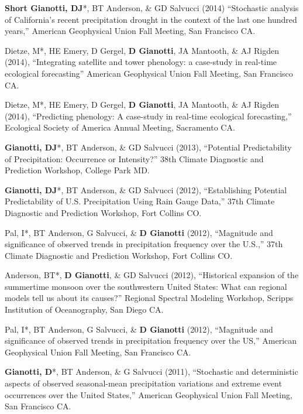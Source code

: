 \documentclass[10pt, a4paper]{article}
\newcommand{\lbr}{\vspace*{12pt}}
\newcommand{\years}[1]{\mbox{}\marginnote{\scriptsize #1}} %
\begin{document}
\years{2014}\textbf{Short Gianotti, DJ}*, BT Anderson, \& GD Salvucci (2014) ``Stochastic analysis of California's recent precipitation drought in the context of the last one hundred years,'' American Geophysical Union Fall Meeting, San Francisco CA.\lbr

\years{2014}Dietze, M*, HE Emery, D Gergel, \textbf{D Gianotti}, JA Mantooth, \& AJ Rigden (2014), ``Integrating satellite and tower phenology: a case-study in real-time ecological forecasting'' American Geophysical Union Fall Meeting, San Francisco CA.\lbr

\years{2014}Dietze, M*, HE Emery, D Gergel, \textbf{D Gianotti}, JA Mantooth, \& AJ Rigden (2014), ``Predicting phenology: A case-study in real-time ecological forecasting,'' Ecological Society of America Annual Meeting, Sacramento CA.\lbr

\years{2013}\textbf{Gianotti, DJ}*, BT Anderson, \& GD Salvucci  (2013), ``Potential Predictability of Precipitation: Occurrence or Intensity?'' 38th Climate Diagnostic and Prediction Workshop, College Park MD.\lbr

\years{2012}\textbf{Gianotti, DJ}*, BT Anderson, \& GD Salvucci (2012), ``Establishing Potential Predictability of U.S. Precipitation Using Rain Gauge Data,'' 37th Climate Diagnostic and Prediction Workshop, Fort Collins CO.\lbr

\years{2012}Pal, I*, BT Anderson, G Salvucci, \& \textbf{D Gianotti}  (2012), ``Magnitude and significance of observed trends in precipitation frequency over the U.S.,'' 37th Climate Diagnostic and Prediction Workshop, Fort Collins CO.\lbr

\years{2012}Anderson, BT*, \textbf{D Gianotti}, \& GD Salvucci (2012), ``Historical expansion of the summertime monsoon over the southwestern United States: What can regional models tell us about its causes?'' Regional Spectral Modeling Workshop, Scripps Institution of Oceanography, San Diego CA.\lbr

\years{2012}Pal, I*, BT Anderson, G Salvucci, \& \textbf{D Gianotti} (2012), ``Magnitude and significance of observed trends in precipitation frequency over the US,'' American Geophysical Union Fall Meeting, San Francisco CA.\lbr

\years{2011}\textbf{Gianotti, D}*, BT Anderson, \& G Salvucci (2011), ``Stochastic and deterministic aspects of observed seasonal-mean precipitation variations and extreme event occurrences over the United States,'' American Geophysical Union Fall Meeting, San Francisco CA.\lbr
\end{document}
